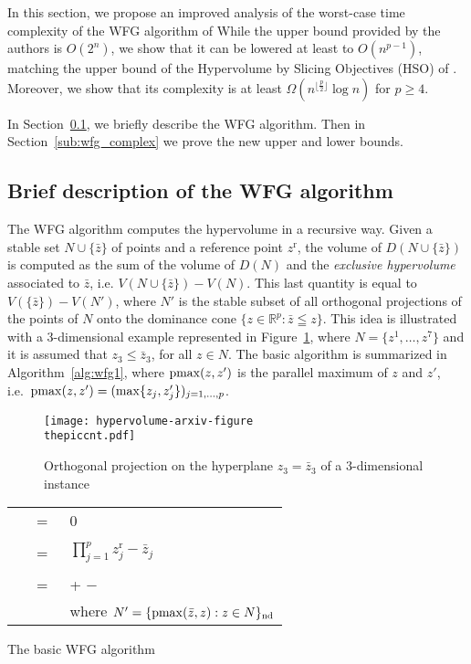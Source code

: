 \documentclass[a4paper,11pt]{article}
\newcommand{\R}{\ensuremath{\mathds{R}}}
\newcommand{\bz}{\bar{z}}
\newcommand{\BM}{z^{\text{r}}}
\newcounter{piccnt}
\begin{document}
In this section, we propose an improved analysis 
of the worst-case time complexity of the WFG algorithm of \citet{WhiBraBar12}
While the upper bound provided by the authors is $O(2^n)$,
we show that it
can be lowered at least to $O(n^{p-1})$, matching the upper bound of the  
Hypervolume by Slicing Objectives (HSO) of \citet{WhiHinBarHub06}.
Moreover, we show that its complexity is at least $\Omega (n^{\lfloor \frac{p}{2} \rfloor} \log n )$
for $p \geq 4$.

In Section~\ref{sub:wfg}, we briefly describe the WFG algorithm. 
Then in Section~\ref{sub:wfg_complex} we prove the new upper and lower bounds.

\subsection{Brief description of the WFG algorithm}\label{sub:wfg}

The WFG algorithm computes the hypervolume in a recursive way.
Given a stable set $N\cup\{\bz\}$ of points and a reference point $\BM$,
the volume of $D(N\cup\{\bz\})$ is computed as the sum of the volume of $D(N)$
and the \emph{exclusive hypervolume} associated to $\bz$, i.e.
$V(N\cup\{\bz\})-V(N)$.
This last quantity is equal to $V(\{\bz\})-V(N')$, 
where $N'$ is the stable subset of all orthogonal projections of the points of $N$ onto the dominance cone
$\{z\in \R^p: \bz\leqq z\}$.
This idea is illustrated with a 3-dimensional example represented in Figure~\ref{fig:wfg1}, 
where $N=\{z^1,\dots,z^7\}$ and it is assumed that 
$z_3 \leq \bz_3$, for all $z\in N$.
The basic algorithm is summarized in Algorithm~\ref{alg:wfg1}, 
where ${\rm pmax} (z, z')$ is the parallel maximum of $z$ and $z'$, 
i.e.\  ${\rm pmax} (z, z') = (\max\{z_j, z'_j\})_{j=1,\dots,p}$.

\begin{figure}
  \begin{center}
    \texttt{[image: hypervolume-arxiv-figure\\thepiccnt.pdf]}
  \end{center}
  
  \caption{Orthogonal projection on the hyperplane $z_3=\bz_3$ of a 3-dimensional instance\label{fig:wfg1}}
\end{figure}



\begin{algorithm}  
  \begin{tabular}{lll}
    \WFG{$\emptyset$}~     &  =~ & 0\; \\
    &&\\[-8pt]
    \WFG{$\{\bz\}$}~       &  =~ & $\prod_{j=1}^p \BM_j - \bz_j$\; \\
    &&\\[-8pt]
    \WFG{$N\cup \{\bz\}$}~ &  =~ &  \WFG{$N$} + \WFG{$\{\bz\}$} $-$ \WFG{$N'$}\;\\
                            &     & where $N'=\{{\rm pmax}(\bz, z):z \in N\}_{\rm nd}$\;
  \end{tabular}\;
  \caption{The basic WFG algorithm\label{alg:wfg1}}
\end{algorithm}
\end{document}
